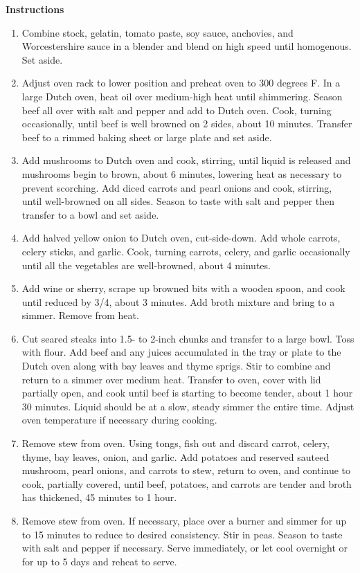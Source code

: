 \documentclass{article}
\numberwithin{figure}{section}
\numberwithin{equation}{section}
\begin{document}
{\bf Instructions}
\begin{enumerate}
\item Combine stock, gelatin, tomato paste, soy sauce, anchovies, and Worcestershire sauce in a blender and blend on high speed until homogenous. Set aside.
\item Adjust oven rack to lower position and preheat oven to 300 degrees F. In a large Dutch oven, heat oil over medium-high heat until shimmering. Season beef all over with salt and pepper and add to Dutch oven. Cook, turning occasionally, until beef is well browned on 2 sides, about 10 minutes. Transfer beef to a rimmed baking sheet or large plate and set aside.
\item Add mushrooms to Dutch oven and cook, stirring, until liquid is released and mushrooms begin to brown, about 6 minutes, lowering heat as necessary to prevent scorching. Add diced carrots and pearl onions and cook, stirring, until well-browned on all sides. Season to taste with salt and pepper then transfer to a bowl and set aside.
\item Add halved yellow onion to Dutch oven, cut-side-down. Add whole carrots, celery sticks, and garlic. Cook, turning carrots, celery, and garlic occasionally until all the vegetables are well-browned, about 4 minutes.
\item Add wine or sherry, scrape up browned bits with a wooden spoon, and cook until reduced by 3/4, about 3 minutes. Add broth mixture and bring to a simmer. Remove from heat.
\item Cut seared steaks into 1.5- to 2-inch chunks and transfer to a large bowl. Toss with flour. Add beef and any juices accumulated in the tray or plate to the Dutch oven along with bay leaves and thyme sprigs. Stir to combine and return to a simmer over medium heat. Transfer to oven, cover with lid partially open, and cook until beef is starting to become tender, about 1 hour 30 minutes. Liquid should be at a slow, steady simmer the entire time. Adjust oven temperature if necessary during cooking.
\item Remove stew from oven. Using tongs, fish out and discard carrot, celery, thyme, bay leaves, onion, and garlic. Add potatoes and reserved sauteed mushroom, pearl onions, and carrots to stew, return to oven, and continue to cook, partially covered, until beef, potatoes, and carrots are tender and broth has thickened, 45 minutes to 1 hour.
\item Remove stew from oven. If necessary, place over a burner and simmer for up to 15 minutes to reduce to desired consistency. Stir in peas. Season to taste with salt and pepper if necessary. Serve immediately, or let cool overnight or for up to 5 days and reheat to serve.
\end{enumerate}
\end{document}
